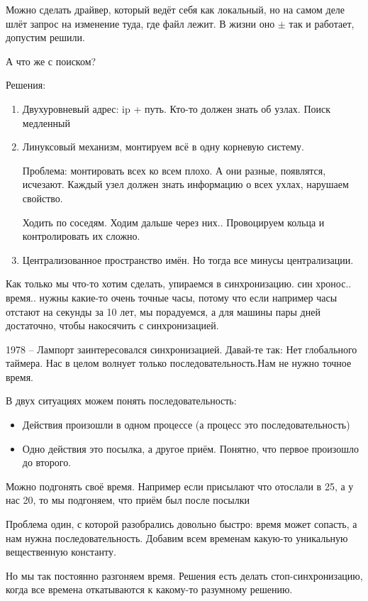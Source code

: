 \documentclass{book}
\theoremstyle{definition}
\begin{document}
Можно сделать драйвер, который ведёт себя как локальный, но на самом деле шлёт запрос на изменение туда, где файл лежит. В жизни оно  $\pm$ так и работает, допустим решили.

А что же с поиском?

Решения:
 \begin{enumerate}
    \item Двухуровневый адрес: ip + путь. Кто-то должен знать об узлах. Поиск медленный
    \item Линуксовый механизм, монтируем всё в одну корневую систему.

        Проблема: монтировать всех ко всем плохо. А они разные, появлятся, исчезают. Каждый узел должен знать информацию о всех ухлах, нарушаем свойство.

        Ходить по соседям. Ходим дальше через них.. Провоцируем кольца и контролировать их сложно.

    \item Централизованное пространство имён. Но тогда все минусы централизации.
\end{enumerate}

Как только мы что-то хотим сделать, упираемся в синхронизацию. син хронос.. время.. нужны какие-то очень точные часы, потому что если например часы отстают на секунды за 10 лет, мы порадуемся, а для машины  пары дней достаточно, чтобы накосячить с синхронизацией.

1978 -- Лампорт заинтересовался синхронизацией. Давай-те так: Нет глобального таймера. Нас в целом волнует только последовательность.Нам не нужно точное время.

В двух ситуациях можем понять последовательность:
\begin{itemize}
    \item Действия произошли в одном процессе (а процесс это последовательность)
    \item Одно действия это посылка, а другое приём. Понятно, что первое произошло до второго.
\end{itemize}

Можно подгонять своё время. Например если присылают что отослали в 25, а у нас 20, то мы подгоняем, что приём был после посылки

Проблема один, с которой разобрались довольно быстро: время может сопасть, а нам нужна последовательность. Добавим всем временам какую-то уникальную вещественную константу.

Но мы так постоянно разгоняем время. Решения есть делать стоп-синхронизацию, когда все времена откатываются к какому-то разумному решению.
\end{document}
